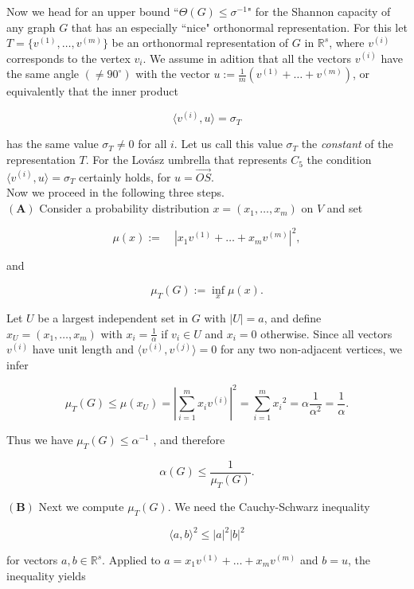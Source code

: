 
\setnewpagemargins

Now we head for an upper bound ``$\Theta(G) \leq \sigma^{-1}$" for the Shannon capacity
of any graph $G$ that has an especially ``nice" orthonormal representation.
For this let $T = \{v^{(1)},\ldots,v^{(m)}\}$ be an orthonormal representation 
of $G$ in $\mathbb{R}^{s}$, where $v^{(i)}$ corresponds to the vertex $v_i$. We assume in
adition that all the vectors $v^{(i)}$ have the same angle $(\neq 90^{\circ})$ with the
vector $u := {\frac{1}{m}}(v^{(1)}+\ldots+v^{(m)})$, or equivalently that the inner product 

\[
 \langle v^{(i)}, u\rangle  = \sigma _T
\]

has the same value $\sigma_T \neq 0$ for all $i$. Let us call this value $\sigma_T$ the \textit{constant}
of the representation $T$. For the Lov\'asz umbrella that represents $C_5$ the 
condition $\langle v^{(i)},u \rangle = \sigma_T$ certainly holds, for $u = \overset{\rightarrow}{OS}$.\\
Now we proceed in the following three steps.\\
$\mathbf{(A)}$ Consider a probability distribution $x = (x_1,\ldots, x_m)$ on $V$ and set

\[
\mu(x) := \quad |x_1v^{(1)}+\ldots+x_mv^{(m)}|^{2},
\]

and

\[
{\mu_{T}}(G) := \underset{x}{\inf}\mu(x).
\]

Let $U$ be a largest independent set in $G$ with $|U| = a$, and define
$x_U = (x_1,\ldots,x_m)$ with $x_i = {\frac{1}{\alpha}}$ if $v_i\in U$ and $x_i = 0$  otherwise. Since all 
vectors $v^{(i)}$  have unit length and $\langle v^{(i)}, v^{(j)} \rangle = 0$ for any two non-adjacent 
vertices, we infer

\[
    \mu_T(G)\leq\mu(x_U)=|\sum_{i=1}^{m}x_iv^{(i)}|^2= \sum_{i=1}^{m} {x_i}^2 = \alpha {\frac{1}{\alpha^{2}}} = {\frac{1}{\alpha}}.
\]

Thus we have $\mu_{T}(G) \leq \alpha^{-1}$ , and therefore

\[
    \alpha(G) \leq {\frac{1}{\mu_{T}(G)}}.
\]

$\mathbf{(B)}$ Next we compute ${\mu_T}(G)$. We need the Cauchy-Schwarz inequality

\[
\langle a,b \rangle^2 \leq |a|^2 |b|^2
\]

for vectors $a,b \in \mathbb{R}^s$. Applied to $a = x_{1}v^{(1)}+\ldots+x_{m}v^{(m)}$ and $b=u$,
the inequality yields

